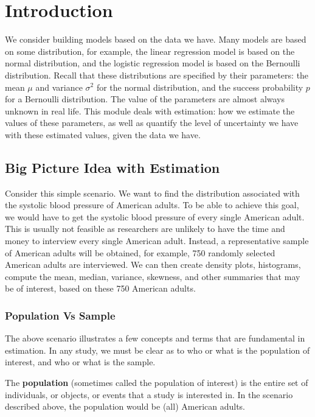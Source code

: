 \documentclass[
]{book}
\begin{document}
\section{Introduction}\label{introduction-3}

We consider building models based on the data we have. Many models are based on some distribution, for example, the linear regression model is based on the normal distribution, and the logistic regression model is based on the Bernoulli distribution. Recall that these distributions are specified by their parameters: the mean \(\mu\) and variance \(\sigma^2\) for the normal distribution, and the success probability \(p\) for a Bernoulli distribution. The value of the parameters are almost always unknown in real life. This module deals with estimation: how we estimate the values of these parameters, as well as quantify the level of uncertainty we have with these estimated values, given the data we have.

\subsection{Big Picture Idea with Estimation}\label{big-picture-idea-with-estimation}

Consider this simple scenario. We want to find the distribution associated with the systolic blood pressure of American adults. To be able to achieve this goal, we would have to get the systolic blood pressure of every single American adult. This is usually not feasible as researchers are unlikely to have the time and money to interview every single American adult. Instead, a representative sample of American adults will be obtained, for example, 750 randomly selected American adults are interviewed. We can then create density plots, histograms, compute the mean, median, variance, skewness, and other summaries that may be of interest, based on these 750 American adults.

\subsubsection{Population Vs Sample}\label{population-vs-sample}

The above scenario illustrates a few concepts and terms that are fundamental in estimation. In any study, we must be clear as to who or what is the population of interest, and who or what is the sample.

The \textbf{population} (sometimes called the population of interest) is the entire set of individuals, or objects, or events that a study is interested in. In the scenario described above, the population would be (all) American adults.
\end{document}
